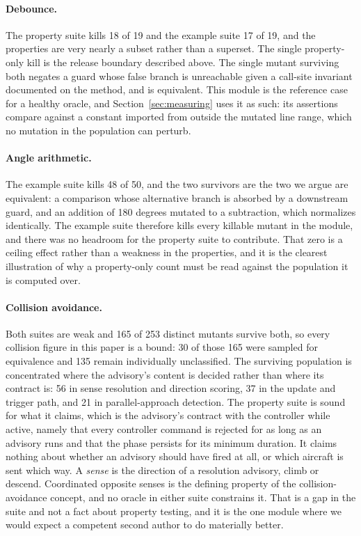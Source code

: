 \documentclass[12pt]{article}
\begin{document}
\paragraph{Debounce.} The property suite kills 18 of 19 and the example suite 17
of 19, and the properties are very nearly a subset rather than a superset. The
single property-only kill is the release boundary described above. The single
mutant surviving both negates a guard whose false branch is unreachable given a
call-site invariant documented on the method, and is equivalent. This module is
the reference case for a healthy oracle, and Section~\ref{sec:measuring} uses it
as such: its assertions compare against a constant imported from outside the
mutated line range, which no mutation in the population can perturb.

\paragraph{Angle arithmetic.} The example suite kills 48 of 50, and the two
survivors are the two we argue are equivalent: a comparison whose alternative
branch is absorbed by a downstream guard, and an addition of 180 degrees mutated
to a subtraction, which normalizes identically. The example suite therefore kills
every killable mutant in the module, and there was no headroom for the property
suite to contribute. That zero is a ceiling effect rather than a weakness in the
properties, and it is the clearest illustration of why a property-only
count must be read against the population it is computed over.

\paragraph{Collision avoidance.} Both suites are weak and 165 of 253 distinct
mutants survive both, so every collision figure in this paper is a bound: 30 of
those 165 were sampled for equivalence and 135 remain individually unclassified. The surviving population is concentrated where the
advisory's content is decided rather than where its contract is: 56 in sense
resolution and direction scoring, 37 in the update and trigger path, and 21 in
parallel-approach detection. The property suite is sound for what it claims,
which is the advisory's contract with the controller while active, namely that
every controller command is rejected for as long as an advisory runs and that the
phase persists for its minimum duration. It claims nothing about whether an
advisory should have fired at all, or which aircraft is sent which way.
A \emph{sense} is the direction of a resolution advisory, climb or descend.
Coordinated opposite senses is the defining property of the collision-avoidance
concept, and no oracle in either suite constrains it. That is a gap in the suite and not a fact about property testing, and it is the one module where we
would expect a competent second author to do materially better.
\end{document}
